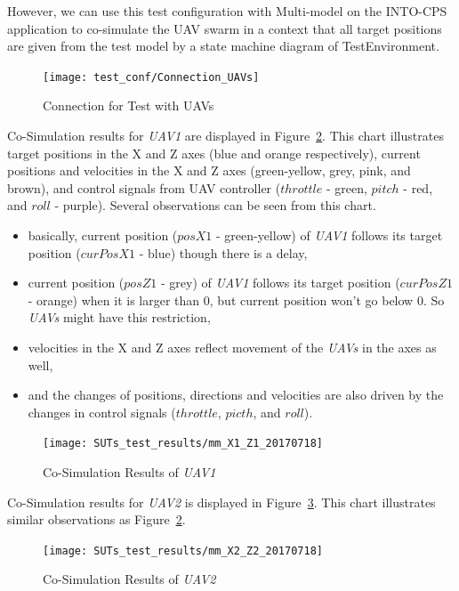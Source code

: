 However, we can use this test configuration with Multi-model on the INTO-CPS application to co-simulate the UAV swarm in a context that all target positions are given from the test model by a state machine diagram of TestEnvironment.

\begin{figure}[htb!]
    \centering
	\texttt{[image: test\_conf/Connection\_UAVs]}
    \caption{Connection for Test with UAVs}
    \label{fig:Connection_UAVs}
\end{figure}

Co-Simulation results for \emph{UAV1} are displayed in Figure~\ref{fig:uav_swarm_7fmus_mm_UAV1}. This chart illustrates target positions in the X and Z axes (blue and orange respectively), current positions and velocities in the X and Z axes (green-yellow, grey, pink, and brown), and control signals from UAV controller ($throttle$ - green, $pitch$ - red, and $roll$ - purple). Several observations can be seen from this chart.
\begin{itemize}
    \item basically, current position ($posX1$ - green-yellow) of \emph{UAV1} follows its target position ($curPosX1$ - blue) though there is a delay,
    \item current position ($posZ1$ - grey) of \emph{UAV1} follows its target position ($curPosZ1$ - orange) when it is larger than 0, but current position won't go below 0. So \emph{UAVs} might have this restriction,
    \item velocities in the X and Z axes reflect movement of the \emph{UAVs} in the axes as well,
    \item and the changes of positions, directions and velocities are also driven by the changes in control signals ($throttle$, $picth$, and $roll$).
\end{itemize}

\begin{figure}[htb!]
    \centering
	\texttt{[image: SUTs\_test\_results/mm\_X1\_Z1\_20170718]}
    \caption{Co-Simulation Results of \emph{UAV1}}
    \label{fig:uav_swarm_7fmus_mm_UAV1}
\end{figure}

Co-Simulation results for \emph{UAV2} is displayed in Figure~\ref{fig:uav_swarm_7fmus_mm_UAV2}. This chart illustrates similar observations as Figure~\ref{fig:uav_swarm_7fmus_mm_UAV1}.

\begin{figure}[htb!]
    \centering
	\texttt{[image: SUTs\_test\_results/mm\_X2\_Z2\_20170718]}
    \caption{Co-Simulation Results of \emph{UAV2}}
    \label{fig:uav_swarm_7fmus_mm_UAV2}
\end{figure}



